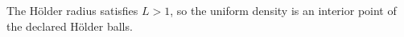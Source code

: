 The H\"older radius satisfies \(L>1\), so the uniform density is an interior point of the declared H\"older balls.
